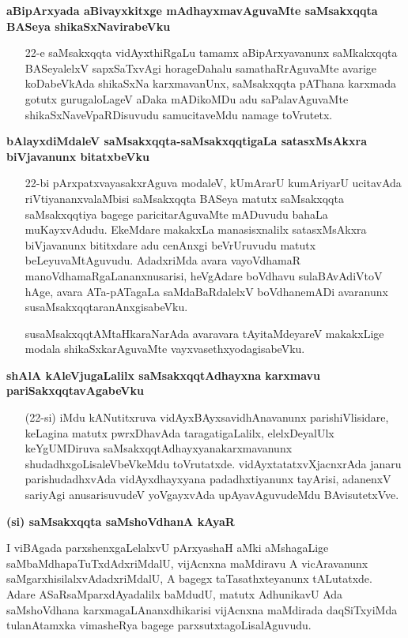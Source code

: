 \textbf{aBipArxyada aBivayxkitxge mAdhayxmavAguvaMte saMsakxqqta BASeya shikaSxNavirabeVku}

\begin{itemize}
\item[22-e] saMsakxqqta vidAyxthiRgaLu tamamx aBipArxyavanunx saMkakxqqta BASeyalelxV sapxSaTxvAgi horageDahalu samathaRrAguvaMte avarige koDabeVkAda shikaSxNa karxmavanUnx, saMsakxqqta pAThana karxmada gotutx gurugaloLageV aDaka mADikoMDu adu saPalavAguvaMte shikaSxNaveVpaRDisuvudu samucitaveMdu namage toVrutetx.
\end{itemize}

\textbf{bAlayxdiMdaleV saMsakxqqta-saMsakxqqtigaLa satasxMsAkxra biVjavanunx bitatxbeVku}

\begin{itemize}
\item[22-bi] pArxpatxvayasakxrAguva modaleV, kUmArarU kumAriyarU ucitavAda riVtiyananxvalaMbisi saMsakxqqta BASeya matutx saMsakxqqta saMsakxqqtiya bagege paricitarAguvaMte mADuvudu bahaLa muKayxvAdudu. EkeMdare makakxLa manasisxnalilx satasxMsAkxra biVjavanunx bititxdare adu cenAnxgi beVrUruvudu matutx beLeyuvaMtAguvudu. AdadxriMda avara vayoVdhamaR manoVdhamaRgaLananxnusarisi, heVgAdare boVdhavu sulaBAvAdiVtoV hAge, avara ATa-pATagaLa saMdaBaRdalelxV boVdhanemADi avaranunx susaMsakxqqtaranAnxgisabeVku.

susaMsakxqqtAMtaHkaraNarAda avaravara tAyitaMdeyareV makakxLige modala shikaSxkarAguvaMte vayxvasethxyodagisabeVku.
\end{itemize}

\textbf{shAlA kAleVjugaLalilx saMsakxqqtAdhayxna karxmavu pariSakxqqtavAgabeVku}

\begin{itemize}
\item[(22-si)] iMdu kANutitxruva vidAyxBAyxsavidhAnavanunx parishiVlisidare, keLagina matutx pwrxDhavAda taragatigaLalilx, elelxDeyalUlx keYgUMDiruva saMsakxqqtAdhayxyanakarxmavanunx shudadhxgoLisaleVbeVkeMdu toVrutatxde. vidAyxtatatxvXjacnxrAda janaru parishudadhxvAda vidAyxdhayxyana padadhxtiyanunx tayArisi,
adanenxV sariyAgi anusarisuvudeV yoVgayxvAda upAyavAguvudeMdu BAvisutetxVve.
\end{itemize}

\textbf{(si) saMsakxqqta saMshoVdhanA kAyaR}

I viBAgada parxshenxgaLelalxvU pArxyashaH aMki aMshagaLige saMbaMdhapaTuTxdAdxriMdalU, vijAcnxna maMdiravu A vicAravanunx saMgarxhisilalxvAdadxriMdalU, A bagegx taTasathxteyanunx tALutatxde. Adare ASaRsaMparxdAyadalilx baMdudU, matutx AdhunikavU Ada saMshoVdhana karxmagaLAnanxdhikarisi vijAcnxna maMdirada daqSiTxyiMda tulanAtamxka vimasheRya bagege parxsutxtagoLisalAguvudu.

